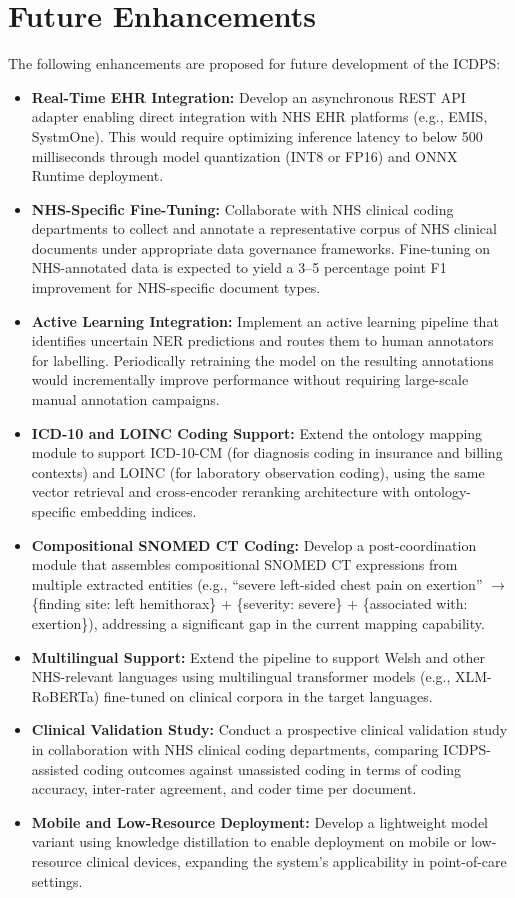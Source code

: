 \section{Future Enhancements}

The following enhancements are proposed for future development of the ICDPS:
\begin{itemize}
    \item \textbf{Real-Time EHR Integration:} Develop an asynchronous REST API adapter enabling direct integration with NHS EHR platforms (e.g., EMIS, SystmOne). This would require optimizing inference latency to below 500 milliseconds through model quantization (INT8 or FP16) and ONNX Runtime deployment.
    \item \textbf{NHS-Specific Fine-Tuning:} Collaborate with NHS clinical coding departments to collect and annotate a representative corpus of NHS clinical documents under appropriate data governance frameworks. Fine-tuning on NHS-annotated data is expected to yield a 3--5 percentage point F1 improvement for NHS-specific document types.
    \item \textbf{Active Learning Integration:} Implement an active learning pipeline that identifies uncertain NER predictions and routes them to human annotators for labelling. Periodically retraining the model on the resulting annotations would incrementally improve performance without requiring large-scale manual annotation campaigns.
    \item \textbf{ICD-10 and LOINC Coding Support:} Extend the ontology mapping module to support ICD-10-CM (for diagnosis coding in insurance and billing contexts) and LOINC (for laboratory observation coding), using the same vector retrieval and cross-encoder reranking architecture with ontology-specific embedding indices.
    \item \textbf{Compositional SNOMED CT Coding:} Develop a post-coordination module that assembles compositional SNOMED CT expressions from multiple extracted entities (e.g., ``severe left-sided chest pain on exertion'' $\rightarrow$ \{finding site: left hemithorax\} + \{severity: severe\} + \{associated with: exertion\}), addressing a significant gap in the current mapping capability.
    \item \textbf{Multilingual Support:} Extend the pipeline to support Welsh and other NHS-relevant languages using multilingual transformer models (e.g., XLM-RoBERTa) fine-tuned on clinical corpora in the target languages.
    \item \textbf{Clinical Validation Study:} Conduct a prospective clinical validation study in collaboration with NHS clinical coding departments, comparing ICDPS-assisted coding outcomes against unassisted coding in terms of coding accuracy, inter-rater agreement, and coder time per document.
    \item \textbf{Mobile and Low-Resource Deployment:} Develop a lightweight model variant using knowledge distillation to enable deployment on mobile or low-resource clinical devices, expanding the system's applicability in point-of-care settings.
\end{itemize}

